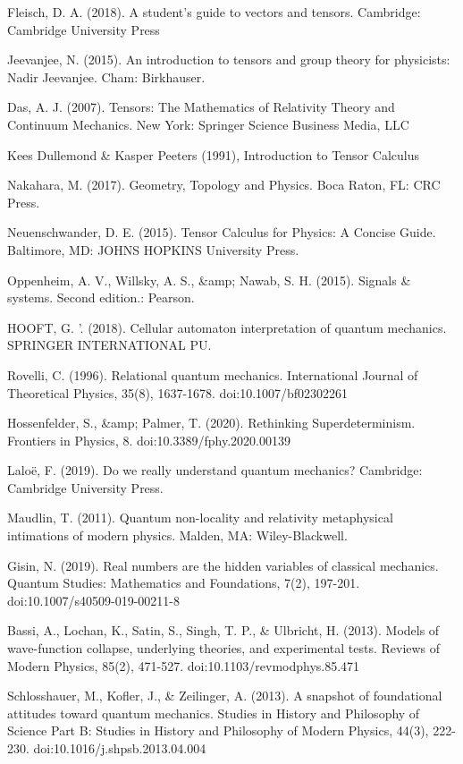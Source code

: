 \documentclass[a4paper,12pt]{book}
\begin{document}
\begin{thebibliography}{9}
	 Fleisch, D. A. (2018). A student's guide to vectors and tensors. Cambridge: Cambridge University Press
	
	 Jeevanjee, N. (2015). An introduction to tensors and group theory for physicists: Nadir Jeevanjee. Cham: Birkhauser.
	
	 Das, A. J. (2007). Tensors: The Mathematics of Relativity Theory and Continuum Mechanics. New York: Springer Science Business Media, LLC
	
	  Kees Dullemond \& Kasper Peeters (1991), Introduction to Tensor Calculus 
		
	 Nakahara, M. (2017). Geometry, Topology and Physics. Boca Raton, FL: CRC Press.
	
	 Neuenschwander, D. E. (2015). Tensor Calculus for Physics: A Concise Guide. Baltimore, MD: JOHNS HOPKINS University Press.
	
	  Oppenheim, A. V., Willsky, A. S., \&amp; Nawab, S. H. (2015). Signals \& systems. Second edition.: Pearson.
	
 HOOFT, G. '. (2018). Cellular automaton interpretation of quantum mechanics. SPRINGER INTERNATIONAL PU.
	 
  Rovelli, C. (1996). Relational quantum mechanics. International Journal of Theoretical Physics, 35(8), 1637-1678. doi:10.1007/bf02302261
 
  Hossenfelder, S., \&amp; Palmer, T. (2020). Rethinking Superdeterminism. Frontiers in Physics, 8. doi:10.3389/fphy.2020.00139
	 
  Laloë, F. (2019). Do we really understand quantum mechanics? Cambridge: Cambridge University Press.
	 
  Maudlin, T. (2011). Quantum non-locality and relativity metaphysical intimations of modern physics. Malden, MA: Wiley-Blackwell.
	 
  Gisin, N. (2019). Real numbers are the hidden variables of classical mechanics. Quantum Studies: Mathematics and Foundations, 7(2), 197-201. doi:10.1007/s40509-019-00211-8
	 
  Bassi, A., Lochan, K., Satin, S., Singh, T. P., \& Ulbricht, H. (2013). Models of wave-function collapse, underlying theories, and experimental tests. Reviews of Modern Physics, 85(2), 471-527. doi:10.1103/revmodphys.85.471
	 
 Schlosshauer, M., Kofler, J., \& Zeilinger, A. (2013). A snapshot of foundational attitudes toward quantum mechanics. Studies in History and Philosophy of Science Part B: Studies in History and Philosophy of Modern Physics, 44(3), 222-230. doi:10.1016/j.shpsb.2013.04.004
	 

\end{thebibliography}
\end{document}
